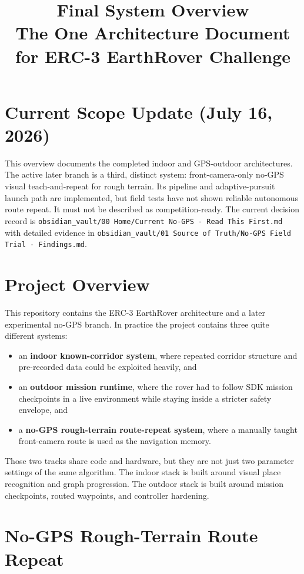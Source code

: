 \documentclass[11pt]{article}
\title{Final System Overview\\
\large The One Architecture Document for ERC-3 EarthRover Challenge}
\author{}
\date{}
\begin{document}
\maketitle

\section*{Current Scope Update (July 16, 2026)}
This overview documents the completed indoor and GPS-outdoor architectures. The
active later branch is a third, distinct system: front-camera-only no-GPS visual
teach-and-repeat for rough terrain. Its pipeline and adaptive-pursuit launch
path are implemented, but field tests have not shown reliable autonomous route
repeat. It must not be described as competition-ready. The current decision
record is \texttt{obsidian\_vault/00 Home/Current No-GPS - Read This First.md}
with detailed evidence in
\texttt{obsidian\_vault/01 Source of Truth/No-GPS Field Trial - Findings.md}.

\section{Project Overview}

This repository contains the ERC-3 EarthRover architecture and a later
experimental no-GPS branch. In practice the project contains three quite
different systems:

\begin{itemize}[nosep]
  \item an \textbf{indoor known-corridor system}, where repeated corridor structure
  and pre-recorded data could be exploited heavily, and
  \item an \textbf{outdoor mission runtime}, where the rover had to follow SDK
  mission checkpoints in a live environment while staying inside a stricter safety
  envelope, and
  \item a \textbf{no-GPS rough-terrain route-repeat system}, where a manually
  taught front-camera route is used as the navigation memory.
\end{itemize}

Those two tracks share code and hardware, but they are not just two parameter
settings of the same algorithm. The indoor stack is built around visual place
recognition and graph progression. The outdoor stack is built around mission
checkpoints, routed waypoints, and controller hardening.

\section{No-GPS Rough-Terrain Route Repeat}
\end{document}
